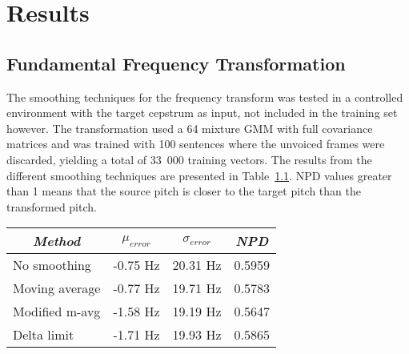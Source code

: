 \chapter{Results} %
\label{cha:results}

% 
% 
% 
% 
% 


\section{Fundamental Frequency Transformation} %
\label{sec:fundamental_frequency_ransformation}
The smoothing techniques for the frequency transform was tested in a controlled environment with the target cepstrum as input, not included in the training set however. The transformation used a 64 mixture GMM with full covariance matrices and was trained with 100 sentences where the unvoiced frames were discarded, yielding a total of 33~000 training vectors. The results from the different smoothing techniques are presented in Table~\ref{tab:pitch_pred_target_input}. NPD values greater than 1 means that the source pitch is closer to the target pitch than the transformed pitch.
\begin{table}[htbp]
	\begin{center}
		\label{tab:pitch_pred_target_input}	
		\begin{tabular}{lrrr}
			\toprule
			\multicolumn{1}{c}{\emph{Method}} & \multicolumn{1}{c}{$\mu_{error}$} & \multicolumn{1}{c}{$\sigma_{error}$} & \multicolumn{1}{c}{\emph{NPD}} \\
			\midrule
			No smoothing & -0.75 Hz & 20.31 Hz & 0.5959\\
			Moving average & -0.77 Hz & 19.71 Hz & 0.5783 \\
			Modified m-avg & -1.58 Hz & 19.19 Hz & 0.5647 \\
			Delta limit & -1.71 Hz & 19.93 Hz & 0.5865 \\
			\bottomrule			
		\end{tabular}		
	\end{center}
\end{table}

